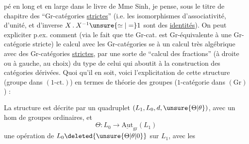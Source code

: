 %
pé en long et en large dans le livre de Mme Sinh, je pense, sous le titre de chapitre des ``Gr-catégories \uline{strictes}'' (i.e.  les isomorphismes d'associativité, d'unité, et d'inverse $X\mathbin{.}X^{-1}\unsure{\simeq|=}1$ sont des \uline{identités}). On peut expliciter p.ex. comment (via le fait que tte Gr-cat. est Gr-équivalente à une Gr-catégorie stricte) le calcul avec les Gr-catégories se  à un calcul très algébrique avec des Gr-catégories \uline{strictes}, par une sorte de ``calcul des fractions'' (à droite ou à gauche, au choix) du type de celui qui aboutit à la construction des catégories dérivées. Quoi qu'il en soit, voici l'explicitation de cette structure (groupe dans $(1\text{-ct.})$) en termes de théorie des groupes ($1$-catégorie dans $(\mathrm{Gr})$) :

La structure est décrite par un  quadruplet $(L_1,L_0,d,\unsure{\Theta|\theta})$, avec
un hom de groupes ordinaires, et
\[
\Theta:L_0\longrightarrow\underline{\mathrm{Aut}}_{\mathrm{gr}}(L_1)
\]
une opération de $L_0\deleted{\unsure{\Theta|\theta|0}}$ sur $L_1$, avec les
